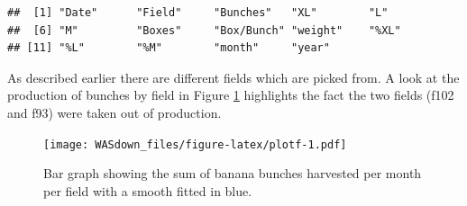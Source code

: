 \documentclass[]{book}
\newenvironment{Shaded}{\begin{snugshade}}{\end{snugshade}}
\newcommand{\KeywordTok}[1]{\textcolor[rgb]{0.13,0.29,0.53}{\textbf{{#1}}}}
\newcommand{\DataTypeTok}[1]{\textcolor[rgb]{0.13,0.29,0.53}{{#1}}}
\newcommand{\DecValTok}[1]{\textcolor[rgb]{0.00,0.00,0.81}{{#1}}}
\newcommand{\FloatTok}[1]{\textcolor[rgb]{0.00,0.00,0.81}{{#1}}}
\newcommand{\StringTok}[1]{\textcolor[rgb]{0.31,0.60,0.02}{{#1}}}
\newcommand{\NormalTok}[1]{{#1}}
\theoremstyle{definition}
\theoremstyle{definition}
\theoremstyle{remark}
\begin{document}
\begin{verbatim}
##  [1] "Date"      "Field"     "Bunches"   "XL"        "L"        
##  [6] "M"         "Boxes"     "Box/Bunch" "weight"    "%XL"      
## [11] "%L"        "%M"        "month"     "year"
\end{verbatim}

\begin{Shaded}
\end{Shaded}

As described earlier there are different fields which are picked from. A
look at the production of bunches by field in Figure \ref{fig:plotf}
highlights the fact the two fields (f102 and f93) were taken out of
production.

\begin{Shaded}
\end{Shaded}

\begin{figure}[htbp]
\centering
\texttt{[image: WASdown\_files/figure-latex/plotf-1.pdf]}
\caption{\label{fig:plotf}Bar graph showing the sum of banana bunches
harvested per month per field with a smooth fitted in blue.}
\end{figure}
\end{document}

